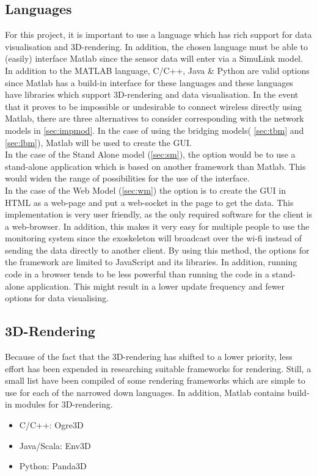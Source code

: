 \subsection{Languages}\label{sec:Languages}
For this project, it is important to use a language which has rich support for data visualisation and 3D-rendering. In addition, the chosen language must be able to (easily) interface Matlab since the sensor data will enter via a SimuLink model. In addition to the MATLAB language, C/C++, Java \& Python are valid options since Matlab has a build-in interface for these languages and these languages have libraries which support 3D-rendering and data visualisation. 
In the event that it proves to be impossible or undesirable to connect wireless directly using Matlab, there are three alternatives to consider corresponding with the network models in \ref{sec:impmod}. In the case of using the bridging models( \ref{sec:tbm} and \ref{sec:lbm}), Matlab will be used to create the GUI.
\\In the case of the Stand Alone model (\ref{sec:sm}), the option would be to use a stand-alone application which is based on another framework than Matlab. This would widen the range of possibilities for the use of the interface.
\\In the case of the Web Model (\ref{sec:wm}) the option is to create the GUI in HTML as a web-page and put a web-socket in the page to get the data. This implementation is very user friendly, as the only required software for the client is a web-browser. In addition, this makes it very easy for multiple people to use the monitoring system since the exoskeleton will broadcast over the wi-fi instead of sending the data directly to another client. By using this method, the options for the framework are limited to JavaScript and its libraries. In addition, running code in a browser tends to be less powerful than running the code in a stand-alone application. This might result in a lower update frequency and fewer options for data visualising.

\subsection{3D-Rendering}\label{sec:rendering}
Because of the fact that the 3D-rendering has shifted to a lower priority, less effort has been expended in researching suitable frameworks for rendering. Still, a small list have been compiled of some rendering frameworks which are simple to use for each of the narrowed down languages. In addition, Matlab contains build-in modules for 3D-rendering.
\begin{itemize}
	\item C/C++: Ogre3D \cite{web:ogre3d}
	\item Java/Scala: Env3D \cite{web:env3d}
	\item Python: Panda3D \cite{web:panda3d}
\end{itemize}
	